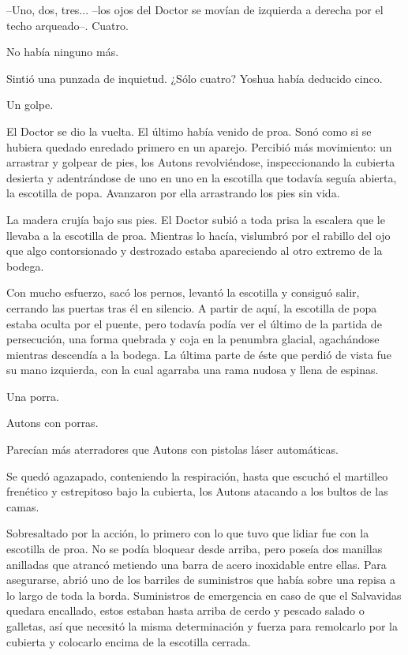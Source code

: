 --Uno, dos, tres... --los ojos del Doctor se movían de izquierda a derecha por el techo arqueado--. Cuatro.
 
No había ninguno más.
 
Sintió una punzada de inquietud. ¿Sólo cuatro? Yoshua había deducido cinco.
 
Un golpe.
 
El Doctor se dio la vuelta. El último había venido de proa. Sonó como si se hubiera quedado enredado primero en un aparejo. Percibió más movimiento: un arrastrar y golpear de pies, los Autons revolviéndose, inspeccionando la cubierta desierta y adentrándose de uno en uno en la escotilla que todavía seguía abierta, la escotilla de popa. Avanzaron por ella arrastrando los pies sin vida.
 
La madera crujía bajo sus pies. El Doctor subió a toda prisa la escalera que le llevaba a la escotilla de proa. Mientras lo hacía, vislumbró por el rabillo del ojo que algo contorsionado y destrozado estaba apareciendo al otro extremo de la bodega.
 
Con mucho esfuerzo, sacó los pernos, levantó la escotilla y consiguó salir, cerrando las puertas tras él en silencio. A partir de aquí, la escotilla de popa estaba oculta por el puente, pero todavía podía ver el último de la partida de persecución, una forma quebrada y coja en la penumbra glacial, agachándose mientras descendía a la bodega. La última parte de éste que perdió de vista fue su mano izquierda, con la cual agarraba una rama nudosa y llena de espinas.
 
Una porra.
 
Autons con porras.
 
Parecían más aterradores que Autons con pistolas láser automáticas.
 
Se quedó agazapado, conteniendo la respiración, hasta que escuchó el martilleo frenético y estrepitoso bajo la cubierta, los Autons atacando a los bultos de las camas.
 
Sobresaltado por la acción, lo primero con lo que tuvo que lidiar fue con la escotilla de proa. No se podía bloquear desde arriba, pero poseía dos manillas anilladas que atrancó metiendo una barra de acero inoxidable entre ellas. Para asegurarse, abrió uno de los barriles de suministros que había sobre una repisa a lo largo de toda la borda. Suministros de emergencia en caso de que el Salvavidas quedara encallado, estos estaban hasta arriba de cerdo y pescado salado o galletas, así que necesitó la misma determinación y fuerza para remolcarlo por la cubierta y colocarlo encima de la escotilla cerrada.
 
